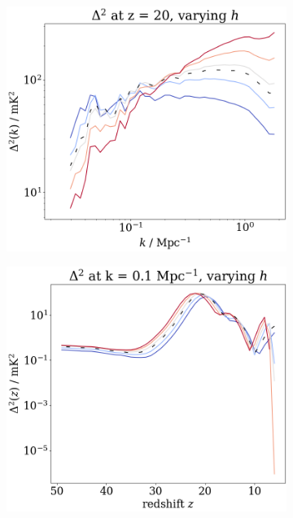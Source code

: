 \documentclass[floats,floatfix,showpacs,amssymb,prd,superscriptaddress,nofootinbib]{revtex4-2} %
\begin{document}
\begin{figure}[H]
\begin{subfigure}[b]{0.45\textwidth}
         \includegraphics[width=\textwidth]{images/simulation_results/power_spectrum_fixed_z_20_h.png}
         \label{fig:power_spectrum_fixed_z_20_h}
     \end{subfigure}
     \hfill
     \begin{subfigure}[b]{0.45\textwidth}
         \centering
         \includegraphics[width=\textwidth]{images/simulation_results/power_spectrum_fixed_k_0.1_h.png}
         \label{fig:power_spectrum_fixed_k_0.1_h}

\end{subfigure}
\end{figure}
\end{document}
